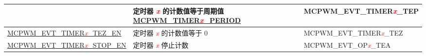 \begin{ThreePartTable}
\begin{longtable}[c]{| l | p{6.5cm} | l |}
    & 定时器 \textcolor{red}{\it{x}} 的计数值等于周期值 \hyperref[fielddesc:MCPWMTIMER0PERIOD]{MCPWM\_TIMER\textcolor{red}{\it{x}}\_PERIOD}
    & MCPWM\_EVT\_TIMER\textcolor{red}{\it{x}}\_TEP    \\\hline
    \hyperref[fielddesc:MCPWMEVTTIMER0TEZEN]{MCPWM\_EVT\_TIMER\textcolor{red}{\it{x}}\_TEZ\_EN}
    & 定时器 \textcolor{red}{\it{x}} 的计数值等于 0
    & MCPWM\_EVT\_TIMER\textcolor{red}{\it{x}}\_TEZ    \\\hline
    \hyperref[fielddesc:MCPWMEVTTIMER0STOPEN]{MCPWM\_EVT\_TIMER\textcolor{red}{\it{x}}\_STOP\_EN}
    & 定时器 \textcolor{red}{\it{x}} 停止计数
    & MCPWM\_EVT\_OP\textcolor{red}{\it{x}}\_TEA   \\\hline
\end{longtable}
\end{ThreePartTable} 